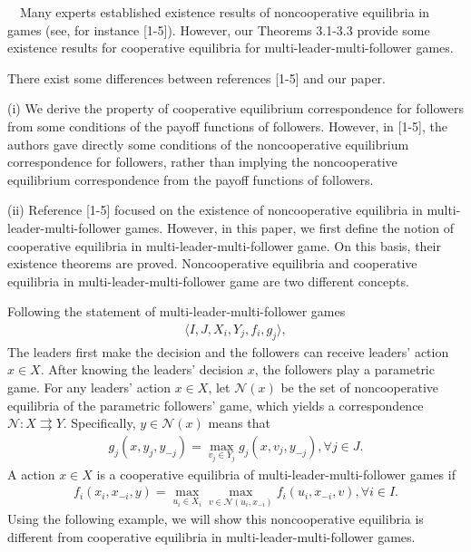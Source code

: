 ~~Many experts established
existence results of noncooperative equilibria in
games (see, for instance [1-5]). However, our
Theorems 3.1-3.3 provide some existence results for
cooperative equilibria
for multi-leader-multi-follower games.

There exist some differences between references [1-5] and our paper.

(i) We derive the property of cooperative equilibrium correspondence
for followers from some conditions of the payoff functions of followers.
However, in [1-5],
the authors gave directly some conditions of the noncooperative equilibrium correspondence
for followers, rather than implying the noncooperative equilibrium correspondence
from the payoff functions of followers.

(ii) Reference [1-5] focused on the existence of noncooperative equilibria
in multi-leader-multi-follower games.
However, in this paper, we first define the notion of cooperative equilibria
in multi-leader-multi-follower game. On this basis, their existence theorems
are proved. Noncooperative equilibria and cooperative equilibria
in multi-leader-multi-follower game are two different concepts.

Following the statement of multi-leader-multi-follower games
\begin{eqnarray*}
\langle I,J,X_i,Y_j,f_i,g_j\rangle,
\end{eqnarray*}
The leaders first make the decision and
the followers can receive leaders' action $x\in X$.
After knowing the leaders' decision $x$, the followers play
a parametric game. For any leaders' action $x\in X$, let $\mathcal{N}(x)$
be the set of noncooperative equilibria of the parametric followers' game, which
yields a correspondence $\mathcal{N}:X\rightrightarrows Y$. Specifically,
${y}\in \mathcal{N}(x)$ means that
\begin{eqnarray*}
g_j(x,y_j,y_{-j})=\max_{v_j\in Y_j}g_j(x,v_j,y_{-j}),\forall j\in J.
\end{eqnarray*}
A action $x\in X$ is a cooperative equilibria of
multi-leader-multi-follower games if
\begin{eqnarray*}
f_i(x_i,x_{-i},y)=\max_{u_i\in X_i}\max_{v\in \mathcal{N}(u_i,x_{-i})}f_i(u_i,x_{-i},v),\forall i\in I.
\end{eqnarray*}
Using the following example, we will show this noncooperative equilibria is
different from cooperative equilibria in multi-leader-multi-follower games.
\\

